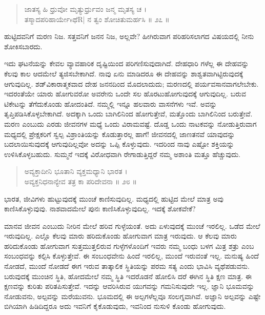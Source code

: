 \begin{verse}
ಜಾತಸ್ಯ ಹಿ ಧ್ರುವೋ ಮೃತ್ಯುರ್ಧ್ರುವಂ ಜನ್ಮ ಮೃತಸ್ಯ ಚ ।\\ತಸ್ಮಾದಪರಿಹಾರ್ಯೇsಥೆR| ನ ತ್ವಂ ಶೋಚಿತುಮರ್ಹಸಿ \num{॥ ೨೭ ॥}
\end{verse}

{\small ಹುಟ್ಟಿದವನಿಗೆ ಮರಣ ನಿಜ. ಸತ್ತವನಿಗೆ ಜನನ ನಿಜ, ಅಲ್ಲವೇ? ಹೀಗಿರುವಾಗ ಪರಿಹರಿಸಲಾಗದ ವಿಷಯದಲ್ಲಿ ನೀನು ಶೋಕಿಸಬಾರದು.}

ಇದು ಘಟನೆಯನ್ನು ಕೇವಲ ವ್ಯಾವಹಾರಿಕ ದೃಷ್ಟಿಯಿಂದ ಪರಿಗಣಿಸುವುದಾಗಿದೆ. ದೇಹಧಾರಿ ಗಳೆಲ್ಲ ಈ ದೇಹವನ್ನು ಕೆಲವು ಕಾಲ ಆದಮೇಲೆ ತ್ಯಜಿಸಬೇಕಾಗಿದೆ. ನಾವು ಏನು ಮಾಡಿದರೂ ಈ ದೇಹವನ್ನು ಶಾಶ್ವತವಾಗಿಟ್ಟಿರುವುದಕ್ಕೆ ಆಗುವುದಿಲ್ಲ. ಶಡ್​ವಿಕಾರಾತ್ಮಕವಾದ ದೇಹ ಜನನದಿಂದ ಮೊದಲಾದುದು; ಮರಣದಲ್ಲಿ ಪರ್ಯವಸಾನವಾಗಲೇಬೇಕು. ಇದರಂತೆಯೇ ಯಾರು ಹೋಗುವರೋ ಅವರೇನು ಒಂದೇ ಸಲ ಹೊರಟುಹೋಗುವುದಕ್ಕೆ ಆಗುವುದಿಲ್ಲ. ಬರುವ ಟಿಕೇಟನ್ನು ತೆಗೆದುಕೊಂಡು ಹೋದಂತಿದೆ. ನಮ್ಮಲ್ಲಿ ಇನ್ನೂ ಹಲವಾರು ವಾಸನೆಗಳು ಇವೆ. ಅವನ್ನು ತೃಪ್ತಿಪಡಿಸಿಕೊಳ್ಳಬೇಕಾಗಿದೆ. ಅದಕ್ಕಾಗಿ ಒಂದು ಬಾಗಿಲಿನಿಂದ ಹೋಗುತ್ತೇವೆ, ಮತ್ತೊಂದು ಬಾಗಿಲಿನಿಂದ ಬರುತ್ತೇವೆ. ಮರಣ ಎಂಬುದು ಎರಡು ಜೀವನಗಳ ಮಧ್ಯೆ ಒಂದು ವಿರಾಮವಷ್ಟೆ. ದೊಡ್ಡ ಒಂದು ನಾಟಕವನ್ನು ನೋಡುತ್ತಿರುವಾಗ ಮಧ್ಯದಲ್ಲಿ ಪ್ರೇಕ್ಷಕರಿಗೆ ಸ್ವಲ್ಪ ವಿಶ್ರಾಂತಿಯನ್ನು ಕೊಡುತ್ತಾರಲ್ಲ ಹಾಗೆ! ಜೀವನದಲ್ಲಿ ಜಾಣತನವೆ ಯಾವುದನ್ನು ಬದಲಾಯಿಸುವುದಕ್ಕೆ ಆಗುವುದಿಲ್ಲವೋ ಅದನ್ನು ಒಪ್ಪಿ ಕೊಳ್ಳುವುದು. ಇದರಿಂದ ನಾವು ಎಷ್ಟೋ ಶಕ್ತಿಯನ್ನು ಉಳಿಸಿಕೊಳ್ಳಬಹುದು. ಸುಮ್ಮನೆ ಇದಕ್ಕೆ ವಿರೋಧವಾಗಿ ರೇಗಾಡುತ್ತಿದ್ದರೆ ನಮ್ಮ ಅಶಾಂತಿ ಮತ್ತೂ ಹೆಚ್ಚುವುದು.

\begin{verse}
ಅವ್ಯಕ್ತಾದೀನಿ ಭೂತಾನಿ ವ್ಯಕ್ತಮಧ್ಯಾನಿ ಭಾರತ ।\\ಅವ್ಯಕ್ತನಿಧನಾನ್ಯೇವ ತತ್ರ ಕಾ ಪರಿದೇವನಾ \num{॥ ೨೮ ॥}
\end{verse}

{\small ಭಾರತ, ಜೀವಿಗಳು ಹುಟ್ಟುವುದಕ್ಕೆ ಮುಂಚೆ ಕಾಣಿಸುವುದಿಲ್ಲ. ಮಧ್ಯದಲ್ಲಿ ಹುಟ್ಟಿದ ಮೇಲೆ ಮಾತ್ರ ಅವು ಕಾಣಿಸಿಕೊಳ್ಳುವುವು. ನಾಶವಾದಮೇಲೆ ಪುನಃ ಕಾಣಿಸಿಕೊಳ್ಳುವುದಿಲ್ಲ. ಇದಕ್ಕೆ ಶೋಕವೇಕೆ?}

ಮಾನವ ಜೀವನ ಎಂಬುದು ನೀರಿನ ಮೇಲೆ ಹರಿವ ಗುಳ್ಳೆಯಂತೆ. ಅದು ಏಳುವುದಕ್ಕೆ ಮುಂಚೆ ಇರಲಿಲ್ಲ. ಒಡೆದ ಮೇಲೆ ಇರುವುದಿಲ್ಲ. ಎಲ್ಲೊ ಕೆಲವು ಮಾರು ಹರಿದುಕೊಂಡು ಹೋಗುವಾಗ ಮಾತ್ರ ಇರುವುದು. ಆ ಕೆಲವು ಮಾರು ಹರಿದುಕೊಂಡು ಹೋಗುವಾಗ ಸುತ್ತಮುತ್ತಲಿರುವ ಗುಳ್ಳೆಗಳೊಂದಿಗೆ ಇವರು ನಮ್ಮ ಬಂಧು ಬಳಗ ಮಿತ್ರ ಶತ್ರು ಎಂಬ ಸಂಬಂಧವನ್ನು ಕಲ್ಪಿಸಿ ಕೊಳ್ಳುತ್ತೇವೆ. ಈ ಸಂಬಂಧವೇನು ಹಿಂದೆ ಇರಲಿಲ್ಲ, ಮುಂದೆ ಇರುವಂತೆ ಇಲ್ಲ. ಮನುಷ್ಯ ಹಿಂದೆ ನೋಡದೆ, ಮುಂದೆ ನೋಡದೆ ಈಗ ಇರುವ ತಾತ್ಕಾಲಿಕ ಸ್ಥಿತಿಯನ್ನು ಪರಮ ಸತ್ಯ ಎಂದು ಭಾವಿಸಿ ವ್ಯಥೆಪಡುವನು. ಬರುವುದಕ್ಕೆ ಮುಂಚಿನ ಸ್ಥಿತಿ, ಹೋದಮೇಲೆ ನಮ್ಮ ಸ್ಥಿತಿ ಇದರೊಡನೆ ಹೋಲಿಸಿ ದರೆ ಈಗಿನ ಸ್ಥಿತಿ ಕ್ಷಣ ಮಾತ್ರ. ಈ ಕ್ಷಣವನ್ನು ಕುರಿತು ಪರಿತಪಿಸುತ್ತೇವೆ. ಇದನ್ನು ಆವರಿಸಿರುವ ಯುಗವನ್ನು ಗಮನಿಸುವುದೇ ಇಲ್ಲ. ಜ್ಞಾನಿ ಭೂಮವನ್ನು ನೋಡುವನು, ಅಲ್ಪವನ್ನು ಮರೆಯುವನು. ಭೂಮದಲ್ಲಿ ಈ ಅಲ್ಪಗಳೆಲ್ಲವೂ ಸಂಲಗ್ನವಾಗಿವೆ. ಅಜ್ಞಾನಿ ಅಲ್ಪವನ್ನು ಎಷ್ಟೇ ಬಿಗಿಯಾಗಿ ಹಿಡಿದಿದ್ದರೂ ಅದು ಇವನಿಗೆ ಕೈಕೊಡುವುದು, ಇವನಿಂದ ನುಸುಳಿ ಕೊಂಡು ಹೋಗುವುದು.


